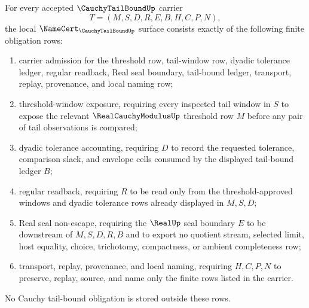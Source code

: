\begin{theorem}
\label{thm:cauchy-tail-bound-namecert-obligations}
For every accepted $\CauchyTailBoundUp$ carrier
$$
T=(M,S,D,R,E,B,H,C,P,N),
$$
the local $\NameCert_{\CauchyTailBoundUp}$ surface consists exactly of the following finite obligation rows:
\begin{enumerate}
\item carrier admission for the threshold row, tail-window row, dyadic tolerance ledger, regular readback, Real seal boundary, tail-bound ledger, transport, replay, provenance, and local naming row;
\item threshold-window exposure, requiring every inspected tail window in $S$ to expose the relevant $\RealCauchyModulusUp$ threshold row $M$ before any pair of tail observations is compared;
\item dyadic tolerance accounting, requiring $D$ to record the requested tolerance, comparison slack, and envelope cells consumed by the displayed tail-bound ledger $B$;
\item regular readback, requiring $R$ to be read only from the threshold-approved windows and dyadic tolerance rows already displayed in $M,S,D$;
\item Real seal non-escape, requiring the $\RealUp$ seal boundary $E$ to be downstream of $M,S,D,R,B$ and to export no quotient stream, selected limit, host equality, choice, trichotomy, compactness, or ambient completeness row;
\item transport, replay, provenance, and local naming, requiring $H,C,P,N$ to preserve, replay, source, and name only the finite rows listed in the carrier.
\end{enumerate}
No Cauchy tail-bound obligation is stored outside these rows.
\end{theorem}
